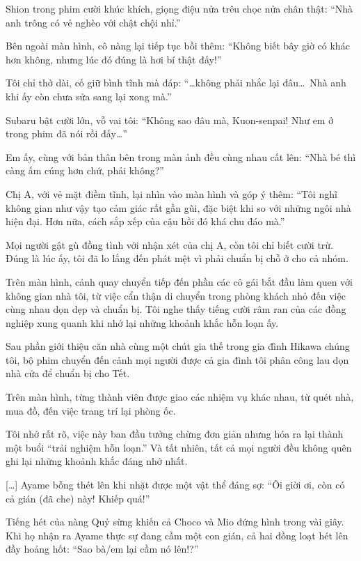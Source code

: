 \documentclass[../main.tex]{subfiles}
\begin{document}
Shion trong phim cười khúc khích, giọng điệu nửa trêu chọc nửa chân thật: ``Nhà anh trông có vẻ nghèo với chật chội nhỉ.''

Bên ngoài màn hình, cô nàng lại tiếp tục bồi thêm: ``Không biết bây giờ có khác hơn không, nhưng lúc đó đúng là hơi bí thật đấy!''

Tôi chỉ thở dài, cố giữ bình tĩnh mà đáp: ``\dots không phải nhắc lại đâu\dots\ Nhà anh khi ấy còn chưa sửa sang lại xong mà.''

Subaru bật cười lớn, vỗ vai tôi: ``Không sao đâu mà, Kuon-senpai! Như em ở trong phim đã nói rồi đấy\dots''

Em ấy, cùng với bản thân bên trong màn ảnh đều cùng nhau cất lên: ``Nhà bé thì càng ấm cúng hơn chứ, phải không?''

Chị A, với vẻ mặt điềm tĩnh, lại nhìn vào màn hình và góp ý thêm: ``Tôi nghĩ không gian như vậy tạo cảm giác rất gần gũi, đặc biệt khi so với những ngôi nhà hiện đại. Hơn nữa, cách sắp xếp của cậu hồi đó khá chu đáo mà.''

Mọi người gật gù đồng tình với nhận xét của chị A, còn tôi chỉ biết cười trừ. Đúng là lúc ấy, tôi đã lo lắng đến phát mệt vì phải chuẩn bị chỗ ở cho cả nhóm.

Trên màn hình, cảnh quay chuyển tiếp đến phần các cô gái bắt đầu làm quen với không gian nhà tôi, từ việc cẩn thận di chuyển trong phòng khách nhỏ đến việc cùng nhau dọn dẹp và chuẩn bị. Tôi nghe thấy tiếng cười râm ran của các đồng nghiệp xung quanh khi nhớ lại những khoảnh khắc hỗn loạn ấy.

Sau phần giới thiệu căn nhà cùng một chút gia thế trong gia đình Hikawa chúng tôi, bộ phim chuyển đến cảnh mọi người được cả gia đình tôi phân công lau dọn nhà cửa để chuẩn bị cho Tết.

Trên màn hình, từng thành viên được giao các nhiệm vụ khác nhau, từ quét nhà, mua đồ, đến việc trang trí lại phòng ốc.

Tôi nhớ rất rõ, việc này ban đầu tưởng chừng đơn giản nhưng hóa ra lại thành một buổi ``trải nghiệm hỗn loạn.'' Và tất nhiên, tất cả mọi người đều không quên ghi lại những khoảnh khắc đáng nhớ nhất.

\il

[\dots] Ayame bỗng thét lên khi nhặt được một vật thể đáng sợ: ``Ôi giời ơi, còn có cả gián (đã che) này! Khiếp quá!''

Tiếng hét của nàng Quỷ sừng khiến cả Choco và Mio đứng hình trong vài giây. Khi họ nhận ra Ayame thực sự đang cầm một con gián, cả hai đồng loạt hét lên đầy hoảng hốt: ``Sao bà/em lại cầm nó lên!?''
\end{document}
